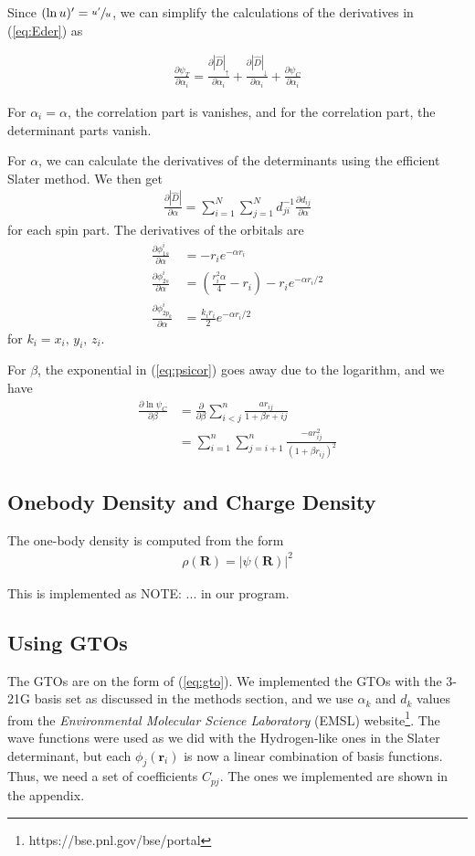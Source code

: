 \documentclass[twocolumns, a4paper,11pt,fleqn]{extarticle}
\newcommand{\eq}[1]{{\small\begin{align*}#1\end{align*}}}
\renewcommand\vec[1]{\boldsymbol{\mathbf{#1}}}
\newcommand{\op}[1]{\hat{#1}}
\begin{document}
Since $(\ln u)' = \sfrac{u'}{u}$, we can simplify the calculations of the derivatives
in (\ref{eq:Eder}) as

\eq{
  \frac{\partial \psi_T}{\partial \alpha_i}
  =\frac{\partial |\op D|_{\uparrow}}{\partial \alpha_i}
  +\frac{\partial |\op D|_{\downarrow}}{\partial \alpha_i}
  +\frac{\partial \psi_C}{\partial \alpha_i}
}

For $\alpha_i = \alpha$, the correlation part is vanishes,
and for the correlation part, the determinant parts vanish.

For $\alpha$, we can calculate the derivatives of the determinants 
using the efficient Slater method.
We then get
\eq{
  \frac{\partial|\op D|}{\partial \alpha}
  =\sum_{i=1}^N \sum_{j=1}^N  d_{ji}^{-1}\frac{\partial d_{ij}}{\partial \alpha}
}
for each spin part.
The derivatives of the orbitals are
\eq{
  \frac{\partial \phi_{1s}^i}{\partial \alpha} &= -r_i e^{-\alpha r_i}\\
  \frac{\partial \phi_{2s}^i}{\partial \alpha} &= 
  \left(
    \frac{r_i^2\alpha}{4}-r_i
  \right)-r_i e^{-\alpha r_i/2}\\
  \frac{\partial \phi_{2p_k}^i}{\partial \alpha} &= \frac{k_i r_i}{2}e^{-\alpha r_i/2}
}
for $k_i=x_i,\,y_i,\,z_i$.

For $\beta$, the exponential in (\ref{eq:psicor}) 
goes away due to the logarithm, and we have
\eq{
  \frac{\partial \ln \psi_C}{\partial \beta}
  &=\frac{\partial}{\partial \beta}\sum_{i<j}^n
    \frac{a r_{ij}}{1+\beta r+{ij}}\\
    &= \sum_{i=1}^n \sum_{j=i+1}^n \frac{-a r_{ij}^2}{(1+\beta r_{ij})^2}
}

\subsection{Onebody Density and Charge Density}
The one-body density is computed from the form 
{\small
\eq{
	\rho(\vec R) = |\psi(\vec R)|^2
}}%

This is implemented as NOTE: ... in our program. 

\subsection{Using GTOs}
The GTOs are on the form of (\ref{eq:gto}).
We implemented the GTOs with the 3-21G basis set as discussed in the
methods section, and we use $\alpha_k$ and $d_k$ values from the 
\textit{Environmental Molecular Science Laboratory} (EMSL) 
website\footnote{https://bse.pnl.gov/bse/portal}. The wave functions were used as
we did with the Hydrogen-like ones
in the Slater determinant, but each $\phi_j(\vec r_i)$ is now a linear combination
of basis functions. Thus, we need a set of coefficients $C_{pj}$.
The ones we implemented are shown in the appendix.
\end{document}
